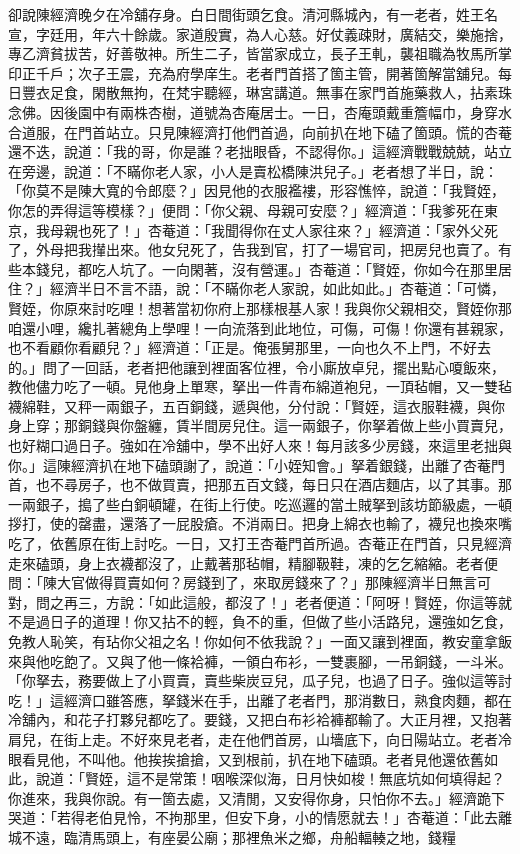 \begin{showcontents}{}
卻說陳經濟晚夕在冷舖存身。白日間街頭乞食。清河縣城內，有一老者，姓王名宣，字廷用，年六十餘歲。家道殷實，為人心慈。好仗義疎財，廣結交，樂施捨，專乙濟貧拔苦，好善敬神。所生二子，皆當家成立，長子王軋，襲祖職為牧馬所掌印正千戶；次子王震，充為府學庠生。老者門首搭了箇主管，開著箇解當舖兒。每日豐衣足食，閑散無拘，在梵宇聽經，琳宮講道。無事在家門首施藥救人，拈素珠念佛。因後園中有兩株杏樹，道號為杏庵居士。一日，杏庵頭戴重簷幅巾，身穿水合道服，在門首站立。只見陳經濟打他們首過，向前扒在地下磕了箇頭。慌的杏菴還不迭，說道：「我的哥，你是誰？老拙眼昏，不認得你。」這經濟戰戰兢兢，站立在旁邊，說道：「不瞞你老人家，小人是賣松橋陳洪兒子。」老者想了半日，說：「你莫不是陳大寬的令郎麼？」因見他的衣服襤褸，形容憔悴，說道：「我賢姪，你怎的弄得這等模樣？」便問：「你父親、母親可安麼？」經濟道：「我爹死在東京，我母親也死了！」杏菴道：「我聞得你在丈人家往來？」經濟道：「家外父死了，外母把我攆出來。他女兒死了，告我到官，打了一場官司，把房兒也賣了。有些本錢兒，都吃人坑了。一向閑著，沒有營運。」杏菴道：「賢姪，你如今在那里居住？」經濟半日不言不語，說：「不瞞你老人家說，如此如此。」杏菴道：「可憐，賢姪，你原來討吃哩！想著當初你府上那樣根基人家！我與你父親相交，賢姪你那咱還小哩，纔扎著總角上學哩！一向流落到此地位，可傷，可傷！你還有甚親家，也不看顧你看顧兒？」經濟道：「正是。俺張舅那里，一向也久不上門，不好去的。」問了一回話，老者把他讓到裡面客位裡，令小廝放卓兒，擺出點心嗄飯來，教他儘力吃了一頓。見他身上單寒，拏出一件青布綿道袍兒，一頂毡帽，又一雙毡襪綿鞋，又秤一兩銀子，五百銅錢，遞與他，分付說：「賢姪，這衣服鞋襪，與你身上穿；那銅錢與你盤纏，賃半間房兒住。這一兩銀子，你拏着做上些小買賣兒，也好糊口過日子。強如在冷舖中，學不出好人來！每月該多少房錢，來這里老拙與你。」這陳經濟扒在地下磕頭謝了，說道：「小姪知會。」拏着銀錢，出離了杏菴門首，也不尋房子，也不做買賣，把那五百文錢，每日只在酒店麵店，以了其事。那一兩銀子，搗了些白銅頓罐，在街上行使。吃巡邏的當土賊拏到該坊節級處，一頓拶打，使的罄盡，還落了一屁股瘡。不消兩日。把身上綿衣也輸了，襪兒也換來嘴吃了，依舊原在街上討吃。一日，又打王杏菴門首所過。杏菴正在門首，只見經濟走來磕頭，身上衣襪都沒了，止戴著那毡帽，精腳靸鞋，凍的乞乞縮縮。老者便問：「陳大官做得買賣如何？房錢到了，來取房錢來了？」那陳經濟半日無言可對，問之再三，方說：「如此這般，都沒了！」老者便道：「阿呀！賢姪，你這等就不是過日子的道理！你又拈不的輕，負不的重，但做了些小活路兒，還強如乞食，免教人恥笑，有玷你父祖之名！你如何不依我說？」一面又讓到裡面，教安童拿飯來與他吃飽了。又與了他一條袷褲，一領白布衫，一雙裹腳，一吊銅錢，一斗米。「你拏去，務要做上了小買賣，賣些柴炭豆兒，瓜子兒，也過了日子。強似這等討吃！」這經濟口雖答應，拏錢米在手，出離了老者門，那消數日，熟食肉麵，都在冷舖內，和花子打夥兒都吃了。要錢，又把白布衫袷褲都輸了。大正月裡，又抱著肩兒，在街上走。不好來見老者，走在他們首房，山墻底下，向日陽站立。老者冷眼看見他，不叫他。他挨挨搶搶，又到根前，扒在地下磕頭。老者見他還依舊如此，說道：「賢姪，這不是常策！咽喉深似海，日月快如梭！無底坑如何填得起？你進來，我與你說。有一箇去處，又清閒，又安得你身，只怕你不去。」經濟跪下哭道：「若得老伯見怜，不拘那里，但安下身，小的情愿就去！」杏菴道：「此去離城不遠，臨清馬頭上，有座晏公廟；那裡魚米之鄉，舟船輻輳之地，錢糧
\end{showcontents}

